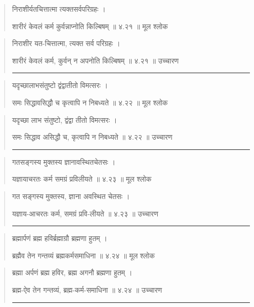 \begin{quotation}

निराशीर्यतचित्तात्मा त्यक्तसर्वपरिग्रहः  ।  

शारीरं केवलं कर्म कुर्वन्नाप्नोति किल्बिषम्‌  ॥ ४.२१ ॥  मूल श्लोक
\end{quotation}

\begin{quotation}

निराशीर यत-चित्तात्मा, त्यक्त सर्व परिग्रहः  ।  

शारीरं केवलं कर्म, कुर्वन् न अपनोति किल्बिषम्‌  ॥ ४.२१ ॥  उच्चारण

\noindent\rule{16cm}{0.4pt} 
\end{quotation}


\begin{quotation}

यदृच्छालाभसंतुष्टो द्वंद्वातीतो विमत्सरः  ।  

समः सिद्धावसिद्धौ च कृत्वापि न निबध्यते  ॥ ४.२२ ॥  मूल श्लोक
\end{quotation}

\begin{quotation}
यदृच्छा लाभ संतुष्टो, द्वंद्वा तीतो विमत्सरः  ।  

समः सिद्धाव असिद्धौ च, कृत्वापि न निबध्यते  ॥ ४.२२ ॥  उच्चारण

\noindent\rule{16cm}{0.4pt} 
\end{quotation}


\begin{quotation}

गतसङ्‍गस्य मुक्तस्य ज्ञानावस्थितचेतसः  ।  

यज्ञायाचरतः कर्म समग्रं प्रविलीयते  ॥ ४.२३ ॥  मूल श्लोक
\end{quotation}

\begin{quotation}

गत सङ्‍गस्य मुक्तस्य, ज्ञाना अवस्थित चेतसः  ।  

यज्ञाय-आचरतः कर्म, समग्रं प्रवि-लीयते  ॥ ४.२३ ॥  उच्चारण

\noindent\rule{16cm}{0.4pt} 
\end{quotation}


\begin{quotation}

ब्रह्मार्पणं ब्रह्म हविर्ब्रह्माग्रौ ब्रह्मणा हुतम्‌  ।  

ब्रह्मैव तेन गन्तव्यं ब्रह्मकर्मसमाधिना  ॥ ४.२४ ॥  मूल श्लोक
\end{quotation}

\begin{quotation}

ब्रह्मा अर्पणं ब्रह्म हविर, ब्रह्म अगनौ ब्रह्मणा हुतम्‌  ।  

ब्रह्म-ऐव तेन गन्तव्यं, ब्रह्म-कर्म-समाधिना  ॥ ४.२४ ॥  उच्चारण

\noindent\rule{16cm}{0.4pt} 
\end{quotation}



